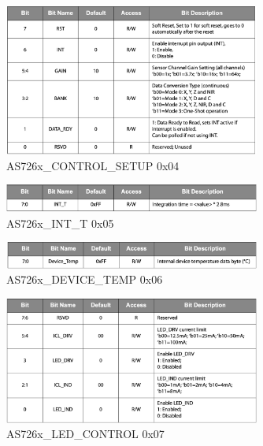 \begin{figure}[H]
\centering
\includegraphics[width=0.75\textwidth]{img/AS726x_CONTROL_SETUP}
\caption{AS726x\_CONTROL\_SETUP 0x04\cite{Datenblatt_AS7261}}
\label{fig:AS726x_CONTROL_SETUP}
\end{figure}

\begin{figure}[H]
\centering
\includegraphics[width=0.75\textwidth]{img/AS726x_INT_T}
\caption{AS726x\_INT\_T 0x05\cite{Datenblatt_AS7261}}
\label{fig:AS726x_INT_T}
\end{figure}

\begin{figure}[H]
\centering
\includegraphics[width=0.75\textwidth]{img/AS726x_DEVICE_TEMP}
\caption{AS726x\_DEVICE\_TEMP 0x06\cite{Datenblatt_AS7261}}
\label{fig:AS726x_DEVICE_TEMP}
\end{figure}

\begin{figure}[H]
\centering
\includegraphics[width=0.75\textwidth]{img/AS726x_LED_CONTROL}
\caption{AS726x\_LED\_CONTROL 0x07\cite{Datenblatt_AS7261}}
\label{fig:AS726x_LED_CONTROL}
\end{figure}

